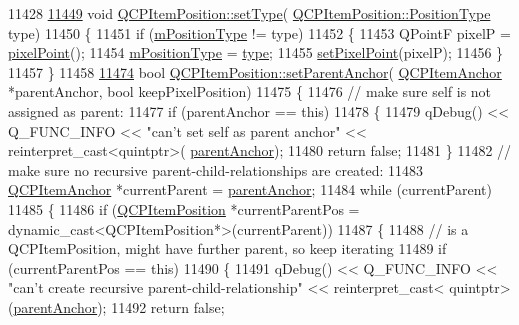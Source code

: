 \begin{DoxyCode}
11428 
\hypertarget{a00115_source_l11449}{}\hyperlink{a00038_aa476abf71ed8fa4c537457ebb1a754ad}{11449} \textcolor{keywordtype}{void} \hyperlink{a00038_aa476abf71ed8fa4c537457ebb1a754ad}{QCPItemPosition::setType}(
      \hyperlink{a00038_aad9936c22bf43e3d358552f6e86dbdc8}{QCPItemPosition::PositionType} type)
11450 \{
11451   \textcolor{keywordflow}{if} (\hyperlink{a00038_ac9c7bbca809601323d3ae2542ef2801a}{mPositionType} != type)
11452   \{
11453     QPointF pixelP = \hyperlink{a00038_ae490f9c76ee2ba33752c495d3b6e8fb5}{pixelPoint}();
11454     \hyperlink{a00038_ac9c7bbca809601323d3ae2542ef2801a}{mPositionType} = \hyperlink{a00038_ad64a1a26fbed5b8917e0eb8843099fd6}{type};
11455     \hyperlink{a00038_ab404e56d9ac2ac2df0382c57933a71ef}{setPixelPoint}(pixelP);
11456   \}
11457 \}
11458 
\hypertarget{a00115_source_l11474}{}\hyperlink{a00038_ac094d67a95d2dceafa0d50b9db3a7e51}{11474} \textcolor{keywordtype}{bool} \hyperlink{a00038_ac094d67a95d2dceafa0d50b9db3a7e51}{QCPItemPosition::setParentAnchor}(
      \hyperlink{a00032}{QCPItemAnchor} *parentAnchor, \textcolor{keywordtype}{bool} keepPixelPosition)
11475 \{
11476   \textcolor{comment}{// make sure self is not assigned as parent:}
11477   \textcolor{keywordflow}{if} (parentAnchor == \textcolor{keyword}{this})
11478   \{
11479     qDebug() << Q\_FUNC\_INFO << \textcolor{stringliteral}{"can't set self as parent anchor"} << \textcolor{keyword}{reinterpret\_cast<}quintptr\textcolor{keyword}{>}(
      \hyperlink{a00038_a0db87cc41efabc1cf94acee7ebe14eee}{parentAnchor});
11480     \textcolor{keywordflow}{return} \textcolor{keyword}{false};
11481   \}
11482   \textcolor{comment}{// make sure no recursive parent-child-relationships are created:}
11483   \hyperlink{a00032}{QCPItemAnchor} *currentParent = \hyperlink{a00038_a0db87cc41efabc1cf94acee7ebe14eee}{parentAnchor};
11484   \textcolor{keywordflow}{while} (currentParent)
11485   \{
11486     \textcolor{keywordflow}{if} (\hyperlink{a00038}{QCPItemPosition} *currentParentPos = dynamic\_cast<QCPItemPosition*>(currentParent))
11487     \{
11488       \textcolor{comment}{// is a QCPItemPosition, might have further parent, so keep iterating}
11489       \textcolor{keywordflow}{if} (currentParentPos == \textcolor{keyword}{this})
11490       \{
11491         qDebug() << Q\_FUNC\_INFO << \textcolor{stringliteral}{"can't create recursive parent-child-relationship"} << \textcolor{keyword}{reinterpret\_cast<}
      quintptr\textcolor{keyword}{>}(\hyperlink{a00038_a0db87cc41efabc1cf94acee7ebe14eee}{parentAnchor});
11492         \textcolor{keywordflow}{return} \textcolor{keyword}{false};

\end{DoxyCode}

